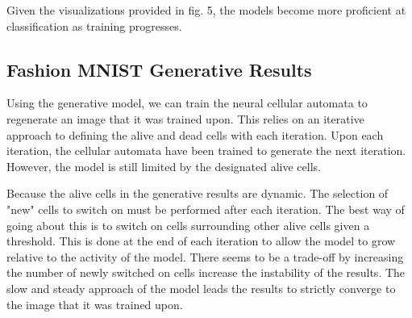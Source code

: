 \documentclass[conference]{IEEEtran}
\begin{document}
Given the visualizations provided in fig. 5, the models become more proficient at classification as training progresses. 

\subsection{Fashion MNIST Generative Results}

Using the generative model, we can train the neural cellular automata to regenerate an image that it was trained upon. This relies on an iterative approach to defining the alive and dead cells with each iteration. Upon each iteration, the cellular automata have been trained to generate the next iteration. However, the model is still limited by the designated alive cells. 

Because the alive cells in the generative results are dynamic. The selection of "new" cells to switch on must be performed after each iteration. The best way of going about this is to switch on cells surrounding other alive cells given a threshold. This is done at the end of each iteration to allow the model to grow relative to the activity of the model. There seems to be a trade-off by increasing the number of newly switched on cells increase the instability of the results. The slow and steady approach of the model leads the results to strictly converge to the image that it was trained upon.  
\end{document}
